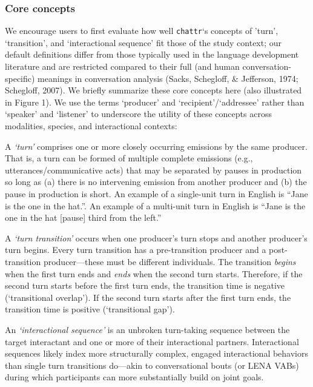 \documentclass[10pt, letterpaper]{article}
\begin{document}
\hypertarget{core-concepts}{%
\subsubsection{Core concepts}\label{core-concepts}}

We encourage users to first evaluate how well \texttt{chattr}`s concepts
of 'turn', `transition', and `interactional sequence' fit those of the
study context; our default definitions differ from those typically used
in the language development literature and are restricted compared to
their full (and human conversation-specific) meanings in conversation
analysis (Sacks, Schegloff, \& Jefferson, 1974; Schegloff, 2007). We
briefly summarize these core concepts here (also illustrated in Figure
1). We use the terms `producer' and `recipient'/`addressee' rather than
`speaker' and `listener' to underscore the utility of these concepts
across modalities, species, and interactional contexts:

A \emph{`turn'} comprises one or more closely occurring emissions by the
same producer. That is, a turn can be formed of multiple complete
emissions (e.g., utterances/communicative acts) that may be separated by
pauses in production so long as (a) there is no intervening emission
from another producer and (b) the pause in production is short. An
example of a single-unit turn in English is ``Jane is the one in the
hat.''. An example of a multi-unit turn in English is ``Jane is the one
in the hat {[}pause{]} third from the left.''

A \emph{`turn transition'} occurs when one producer's turn stops and
another producer's turn begins. Every turn transition has a
pre-transition producer and a post-transition producer---these must be
different individuals. The transition \emph{begins} when the first turn
ends and \emph{ends} when the second turn starts. Therefore, if the
second turn starts before the first turn ends, the transition time is
negative (`transitional overlap'). If the second turn starts after the
first turn ends, the transition time is positive (`transitional gap').

An \emph{`interactional sequence'} is an unbroken turn-taking sequence
between the target interactant and one or more of their interactional
partners. Interactional sequences likely index more structurally
complex, engaged interactional behaviors than single turn transitions
do---akin to conversational bouts (or LENA VABs) during which
participants can more substantially build on joint goals.
\end{document}
